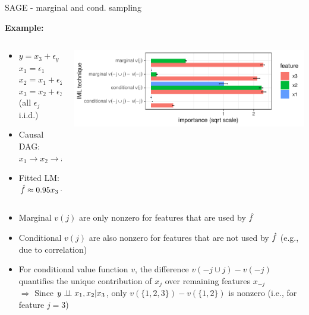 \documentclass[10pt,compress,t,notes=noshow, xcolor=table]{beamer}
\begin{document}
\begin{frame}{SAGE - marginal and cond. sampling}

\textbf{Example:}
%
\begin{columns}[T, totalwidth=\textwidth]
\begin{column}{0.4\textwidth}
\begin{itemize}
    \item $y = x_3 + \epsilon_y$\\ $x_1 = \epsilon_1$\\ $x_2 = x_1 + \epsilon_2$\\ $x_3 = x_2 + \epsilon_3$ (all $\epsilon_j$ i.i.d.)
    \item Causal DAG: $x_1 \rightarrow x_2 \rightarrow x_3 \rightarrow y$
    \item Fitted LM: $\hat{f} \approx 0.95 x_3 + 0.05 x_2$
\end{itemize}
\end{column}
\pause
\begin{column}{0.6\textwidth}
\centerline{\includegraphics[width=\linewidth]{figure_man/sage_variants}}
\end{column}
\end{columns}
\lz
\begin{itemize}
    \item Marginal $v(j)$ are only nonzero for features that are used by $\hat{f}$
    \item Conditional $v(j)$ are also nonzero for features that are not used by $\hat{f}$ (e.g., due to correlation)
    \item For conditional value function $v$, the difference $v(-j \cup j) - v(-j)$ quantifies the unique contribution of $x_j$ over remaining features $x_{-j}$\\
    $\Rightarrow$ Since $y \perp \!\!\! \perp x_1, x_2 | x_3$, only $v(\{1,2,3\}) - v(\{1, 2\})$ is nonzero (i.e., for feature $j = 3$)
\end{itemize}

\end{frame}
\end{document}
